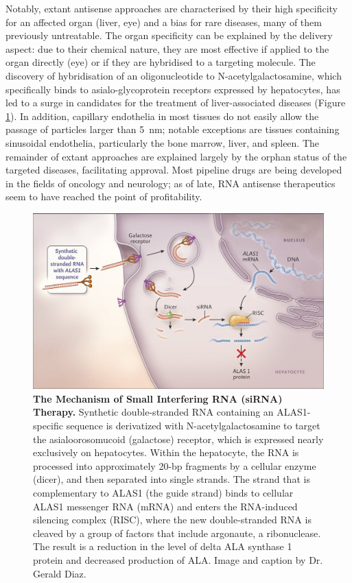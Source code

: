 Notably, extant antisense approaches are characterised by their high specificity for an affected organ (liver, eye) and a bias for rare diseases, many of them previously untreatable. The organ specificity can be explained by the delivery aspect: due to their chemical nature, they are most effective if applied to the organ directly (eye) or if they are hybridised to a targeting molecule. The discovery of hybridisation of an oligonucleotide to N-acetylgalactosamine, which specifically binds to asialo-glycoprotein receptors expressed by hepatocytes, has led to a surge in candidates for the treatment of liver-associated diseases (Figure \ref{fig:pathophys-porphyria}).\cite{Wang2020} In addition, capillary endothelia in most tissues do not easily allow the passage of particles larger than \SI{5}{\nano\metre}; notable exceptions are tissues containing sinusoidal endothelia, particularly the bone marrow, liver, and spleen.\cite{Gullotti2009, Hassanshahi2019} The remainder of extant approaches are explained largely by the orphan status of the targeted diseases, facilitating approval. Most pipeline drugs are being developed in the fields of oncology and neurology; as of late, RNA antisense therapeutics seem to have reached the point of profitability.\cite{Wang2020} 

\begin{figure}[ht]
\includegraphics[width=\textwidth]{figures/pathophys-porphyria-therapy-sirna-nejm-original}
\caption[The Mechanism of Small Interfering RNA (siRNA) Therapy.]{\textbf{The Mechanism of Small Interfering RNA (siRNA) Therapy.} Synthetic double-stranded RNA containing an ALAS1-specific sequence is derivatized with N-acetylgalactosamine to target the asialoorosomucoid (galactose) receptor, which is expressed nearly exclusively on hepatocytes. Within the hepatocyte, the RNA is processed into approximately 20-bp fragments by a cellular enzyme (dicer), and then separated into single strands. The strand that is complementary to ALAS1 (the guide strand) binds to cellular ALAS1 messenger RNA (mRNA) and enters the RNA-induced silencing complex (RISC), where the new double-stranded RNA is cleaved by a group of factors that include argonaute, a ribonuclease. The result is a reduction in the level of delta ALA synthase 1 protein and decreased production of ALA. Image and caption by Dr. Gerald Diaz.\cite{Diaz2018}
\label{fig:pathophys-porphyria}}
\end{figure}


